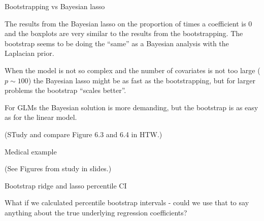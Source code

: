 \documentclass[
  ignorenonframetext,
]{beamer}
\begin{document}
\begin{frame}

\begin{block}{Bootstrapping vs Bayesian lasso}

The results from the Bayesian lasso on the proportion of times a
coefficient is 0 and the boxplots are very similar to the results from
the bootstrapping. The bootstrap seems to be doing the ``same'' as a
Bayesian analysis with the Laplacian prior.

When the model is not so complex and the number of covariates is not too
large (\(p\sim 100\)) the Bayesian lasso might be as fast as the
bootstrapping, but for larger problems the bootstrap ``scales better''.

For GLMs the Bayesian solution is more demanding, but the bootstrap is
as easy as for the linear model.

(STudy and compare Figure 6.3 and 6.4 in HTW.)

\end{block}

\end{frame}

\begin{frame}

\begin{block}{Medical example}

(See Figures from study in slides.)

\end{block}

\end{frame}

\begin{frame}

\begin{block}{Bootstrap ridge and lasso percentile CI}

What if we calculated percentile bootstrap intervals - could we use that
to say anything about the true underlying regression coefficients?

\end{block}

\end{frame}
\end{document}
